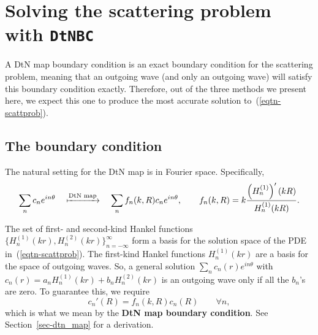 \section{Solving the scattering problem with {\tt DtNBC}}
\label{sec-DtNBC}

A DtN map boundary condition is an exact boundary condition
for the scattering problem, meaning that an outgoing wave
(and only an outgoing wave) will satisfy this boundary condition
exactly. Therefore, out of the three methods we present here,
we expect this one to produce the most accurate solution
to~(\ref{eqtn-scattprob}).

\subsection{The boundary condition}
\label{sec-DtNBC-BC}

The natural setting for the DtN map is in Fourier space.
Specifically, 
\begin{equation}\label{eqtn-dtnmap}
 \sum_n c_n e^{in\theta} 
 \quad\xmapsto{\text{DtN map}}\quad
 \sum_n f_n(k,R) c_n e^{in\theta},
 \qquad
 f_n(k,R) = k\frac{\left(H_n^{(1)}\right)'(kR)}{H_n^{(1)}(kR)}.
\end{equation}

The set of first- and second-kind Hankel functions 
$\lbrace H_n^{(1)}(kr), H_n^{(2)}(kr) \rbrace_{n=-\infty}^\infty$
form a basis for the solution space of the PDE
in~(\ref{eqtn-scattprob}). 
The first-kind Hankel functions $H_n^{(1)}(kr)$ are a basis for the
space of outgoing waves. 
So, a general solution 
$\sum_n c_n(r) e^{in\theta}$ with
$c_n(r) = a_n H_n^{(1)}(kr) + b_n H_n^{(2)}(kr)$
is an outgoing wave only if all the $b_n$'s are zero.
To guarantee this, we require
\begin{equation}\label{eqtn-dtnbc}
 c_n'(R) = f_n(k,R) c_n(R) \qquad \forall n,
\end{equation}
which is what we mean by the {\bf DtN map boundary condition}.
See Section~\ref{sec-dtn_map} for a derivation.

